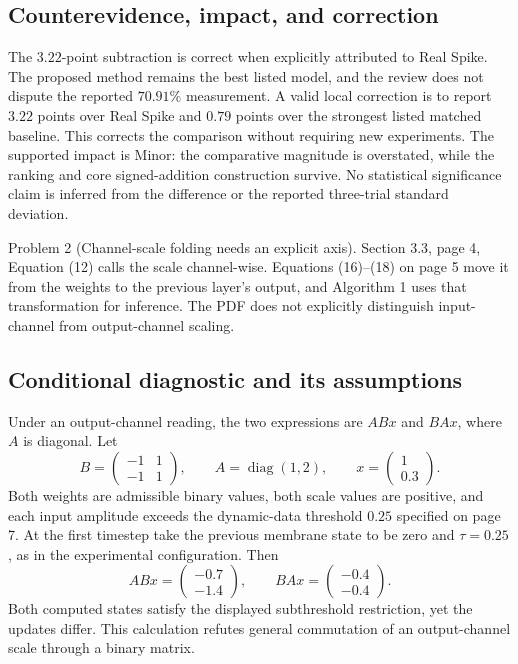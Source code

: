 \documentclass[10pt]{article}
\begin{document}
\subsection*{Counterevidence, impact, and correction}
The \(3.22\)-point subtraction is correct when explicitly attributed to Real Spike. The proposed method remains the best listed model, and the review does not dispute the reported \(70.91\%\) measurement. A valid local correction is to report \(3.22\) points over Real Spike and \(0.79\) points over the strongest listed matched baseline. This corrects the comparison without requiring new experiments. The supported impact is Minor: the comparative magnitude is overstated, while the ranking and core signed-addition construction survive. No statistical significance claim is inferred from the difference or the reported three-trial standard deviation.\par
Problem 2 (Channel-scale folding needs an explicit axis).  Section 3.3, page 4, Equation (12) calls the scale channel-wise. Equations (16)–(18) on page 5 move it from the weights to the previous layer’s output, and Algorithm 1 uses that transformation for inference. The PDF does not explicitly distinguish input-channel from output-channel scaling.\par
\subsection*{Conditional diagnostic and its assumptions}
Under an output-channel reading, the two expressions are \(ABx\) and \(BAx\), where \(A\) is diagonal. Let \[B=\begin{pmatrix}-1&1\\-1&1\end{pmatrix},\qquad
 A=\operatorname{diag}(1,2),\qquad
 x=\begin{pmatrix}1\\0.3\end{pmatrix}.\] Both weights are admissible binary values, both scale values are positive, and each input amplitude exceeds the dynamic-data threshold \(0.25\) specified on page 7. At the first timestep take the previous membrane state to be zero and \(\tau=0.25\), as in the experimental configuration. Then \[ABx=\begin{pmatrix}-0.7\\-1.4\end{pmatrix},
 \qquad BAx=\begin{pmatrix}-0.4\\-0.4\end{pmatrix}.\] Both computed states satisfy the displayed subthreshold restriction, yet the updates differ. This calculation refutes general commutation of an output-channel scale through a binary matrix.\par
\end{document}
